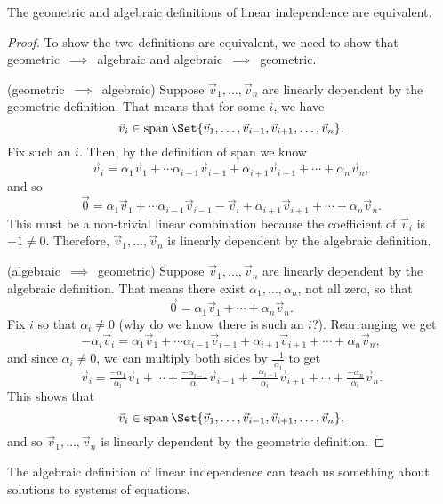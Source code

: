 \begin{theorem}
	The geometric and algebraic definitions of linear independence are equivalent.
\end{theorem}
\begin{proof}
	To show the two definitions are equivalent, we need to show that geometric~$\implies$~algebraic
	and algebraic~$\implies$~geometric.

	\medskip
	\noindent
	(geometric~$\implies$~algebraic) Suppose $\vec v_1,\ldots,\vec v_n$ are linearly dependent by the 
	geometric definition. That means that for some $i$, we have
	\[
		\vec v_i \in \Span\Set{\vec v_1,\ldots,\vec v_{i-1},\vec v_{i+1},\ldots,\vec v_n}.
	\]
	Fix such an $i$. Then, by the definition of span we know
	\[
		\vec v_i=\alpha_1\vec v_1+\cdots \alpha_{i-1}\vec v_{i-1}+\alpha_{i+1}\vec v_{i+1}+\cdots +\alpha_n\vec v_n,
	\]
	and so
	\[
		\vec 0=\alpha_1\vec v_1+\cdots \alpha_{i-1}\vec v_{i-1}-\vec v_i+\alpha_{i+1}\vec v_{i+1}+\cdots +\alpha_n\vec v_n.
	\]
	This must be a non-trivial linear combination because the coefficient of $\vec v_i$ is $-1\neq 0$. Therefore, 
	$\vec v_1,\ldots,\vec v_n$ is linearly dependent by the algebraic definition.
	
	\medskip
	\noindent
	(algebraic~$\implies$~geometric) Suppose $\vec v_1,\ldots,\vec v_n$ are linearly dependent by the 
	algebraic definition. That means there exist $\alpha_1,\ldots,\alpha_n$, not all zero, so that
	\[
		\vec 0=\alpha_1\vec v_1+\cdots +\alpha_n\vec v_n.
	\]
	Fix $i$ so that $\alpha_i\neq 0$ (why do we know there is such an $i$?). Rearranging we get
	\[
		-\alpha_i\vec v_i=\alpha_1\vec v_1+\cdots \alpha_{i-1}\vec v_{i-1}+\alpha_{i+1}\vec v_{i+1}+\cdots +\alpha_n\vec v_n,
	\]
	and since $\alpha_i\neq 0$, we can multiply both sides by $\frac{-1}{\alpha_i}$ to get
	\[
		\vec v_i=\tfrac{-\alpha_1}{\alpha_i}\vec v_1+\cdots +\tfrac{-\alpha_{i-1}}{\alpha_i}\vec v_{i-1}
	+\tfrac{-\alpha_{i+1}}{\alpha_i}\vec v_{i+1}+\cdots +\tfrac{-\alpha_n}{\alpha_i}\vec v_n.
	\]
	This shows that
	\[
		\vec v_i \in \Span\Set{\vec v_1,\ldots,\vec v_{i-1},\vec v_{i+1},\ldots,\vec v_n},
	\]
	and so $\vec v_1,\ldots,\vec v_n$ is linearly dependent by the geometric definition.
\end{proof}


The algebraic definition of linear independence can teach us something about
solutions to systems of equations. 

